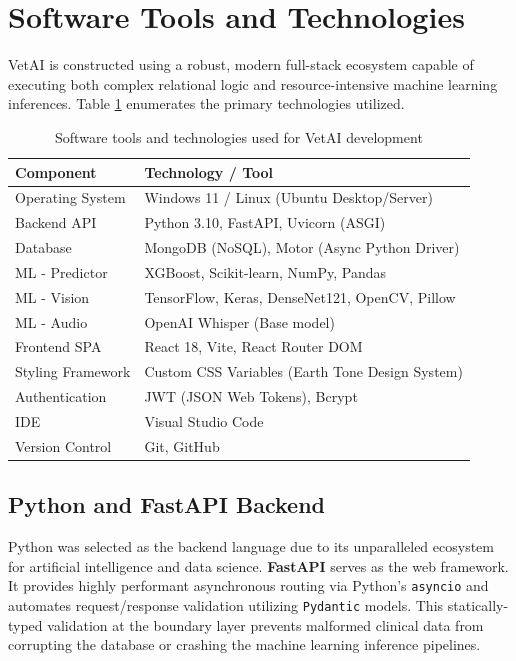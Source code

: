 \documentclass[a4paper,12pt]{report}
\begin{document}
\section{Software Tools and Technologies}

VetAI is constructed using a robust, modern full-stack ecosystem capable of executing both complex relational logic and resource-intensive machine learning inferences. Table \ref{tab:tools} enumerates the primary technologies utilized.

\begin{table}[H]
\centering
\caption{Software tools and technologies used for VetAI development}
\label{tab:tools}
\renewcommand{\arraystretch}{1.3}
\vspace{10pt}
\begin{tabular}{|l|p{9cm}|}
\hline
\textbf{Component} & \textbf{Technology / Tool} \\
\hline
Operating System  & Windows 11 / Linux (Ubuntu Desktop/Server) \\
Backend API       & Python 3.10, FastAPI, Uvicorn (ASGI) \\
Database          & MongoDB (NoSQL), Motor (Async Python Driver) \\
ML - Predictor    & XGBoost, Scikit-learn, NumPy, Pandas \\
ML - Vision       & TensorFlow, Keras, DenseNet121, OpenCV, Pillow \\
ML - Audio        & OpenAI Whisper (Base model) \\
Frontend SPA      & React 18, Vite, React Router DOM \\
Styling Framework & Custom CSS Variables (Earth Tone Design System) \\
Authentication    & JWT (JSON Web Tokens), Bcrypt \\
IDE               & Visual Studio Code \\
Version Control   & Git, GitHub \\
\hline
\end{tabular}
\end{table}

\subsection{Python and FastAPI Backend}

Python was selected as the backend language due to its unparalleled ecosystem for artificial intelligence and data science. \textbf{FastAPI} serves as the web framework. It provides highly performant asynchronous routing via Python's \texttt{asyncio} and automates request/response validation utilizing \texttt{Pydantic} models. This statically-typed validation at the boundary layer prevents malformed clinical data from corrupting the database or crashing the machine learning inference pipelines.
\end{document}
